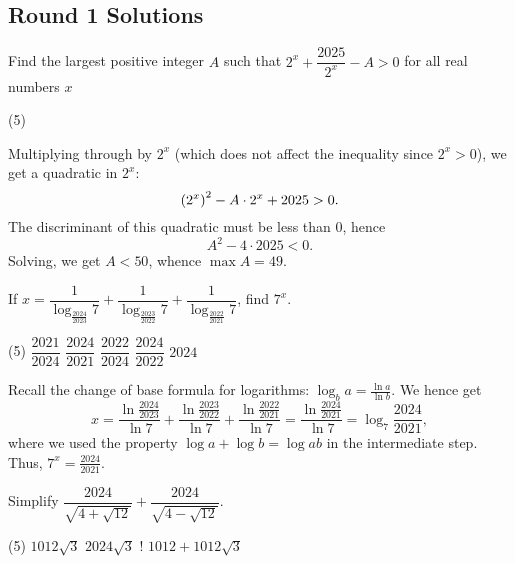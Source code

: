 \subsection{Round 1 Solutions}\label{S::2024-S-1}

\begin{question}[D]\label{A::2024-S-1-1}
    Find the largest positive integer $A$ such that $2^x + \dfrac{2025}{2^x} - A > 0$ for all real numbers $x$

    \begin{tasks}(5)
    \end{tasks}
\end{question}

Multiplying through by $2^x$ (which does not affect the inequality since $2^x > 0$), we get a quadratic in $2^x$: \[\left( 2^x \right)^2 - A \cdot 2^x + 2025 > 0.\] The discriminant of this quadratic must be less than 0, hence \[A^2 - 4 \cdot 2025 < 0.\] Solving, we get $A < 50$, whence $\max A = 49$.

\begin{question}[B]\label{A::2024-S-1-2}
    If $x = \dfrac{1}{\log_{\frac{2024}{2023}} 7} + \dfrac{1}{\log_{\frac{2023}{2022}} 7} + \dfrac{1}{\log_{\frac{2022}{2021}} 7}$, find $7^x$.

    \begin{tasks}(5)
        \task $\dfrac{2021}{2024}$
        \task $\dfrac{2024}{2021}$
        \task $\dfrac{2022}{2024}$
        \task $\dfrac{2024}{2022}$
        \task $2024$
    \end{tasks}
\end{question}

Recall the change of base formula for logarithms: $\log_b a = \frac{\ln a}{\ln b}$. We hence get \[x = \frac{\ln \frac{2024}{2023}}{\ln 7} + \frac{\ln \frac{2023}{2022}}{\ln 7} + \frac{\ln \frac{2022}{2021}}{\ln 7} = \frac{\ln \frac{2024}{2021}}{\ln 7} = \log_7 \frac{2024}{2021},\] where we used the property $\log a + \log b = \log ab$ in the intermediate step. Thus, $7^x = \frac{2024}{2021}$.

\begin{question}[D]\label{A::2024-S-1-3}
    Simplify $\dfrac{2024}{\sqrt{4 + \sqrt{12}}} + \dfrac{2024}{\sqrt{4 - \sqrt{12}}}$.

    \begin{tasks}(5)
        \task $1012\sqrt3$
        \task $2024\sqrt3$
        \task! $1012 + 1012\sqrt3$
    \end{tasks}
\end{question}

